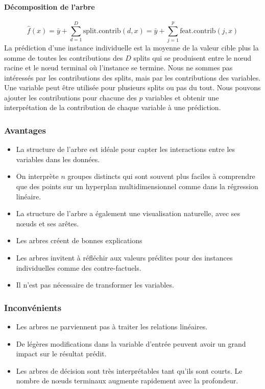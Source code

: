 \paragraph{Décomposition de l'arbre}
\[ \hat{f}(x) = \bar{y} + \sum_{d=1}^D \text{split.contrib}(d,x) = \bar{y} + \sum_{j=1}^p \text{feat.contrib}(j,x) \]
La prédiction d'une instance individuelle est la moyenne de la valeur cible plus la somme de toutes les contributions des \(D\) splits qui se produisent entre le nœud racine et le nœud terminal où l'instance se termine. Nous ne sommes pas intéressés par les contributions des splits, mais par les contributions des variables. Une variable peut être utilisée pour plusieurs splits ou pas du tout. Nous pouvons ajouter les contributions pour chacune des \(p\) variables et obtenir une interprétation de la contribution de chaque variable à une prédiction.

\subsubsection{Avantages}
\begin{itemize}
    \item La structure de l'arbre est idéale pour capter les interactions entre les variables dans les données.
    \item On interprète \(n\) groupes distincts qui sont souvent plus faciles à comprendre que des points sur un hyperplan multidimensionnel comme dans la régression linéaire.
    \item La structure de l'arbre a également une visualisation naturelle, avec ses nœuds et ses arêtes.
    \item Les arbres créent de bonnes explications
    \item Les arbres invitent à réfléchir aux valeurs prédites pour des instances individuelles comme des contre-factuels.
    \item Il n'est pas nécessaire de transformer les variables.
\end{itemize}

\subsubsection{Inconvénients}
\begin{itemize}
    \item Les arbres ne parviennent pas à traiter les relations linéaires.
    \item De légères modifications dans la variable d'entrée peuvent avoir un grand impact sur le résultat prédit.
    \item Les arbres de décision sont très interprétables tant qu'ils sont courts. Le nombre de nœuds terminaux augmente rapidement avec la profondeur.
\end{itemize}

